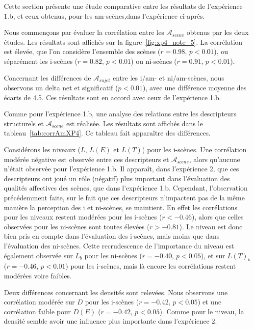 Cette section présente une étude comparative entre les résultats de l'expérience 1.b, et ceux obtenus, pour les am-scènes,dans l'expérience ci-après. 

Nous commençons par évaluer la corrélation entre les $\mathcal{A}_{scene}$ obtenus par les deux études. Les résultats sont affichés sur la figure~\ref{fig:xp4_note_5}. La corrélation est élevée, que l'on considère l'ensemble des scènes ($r=0.98$, $p<0.01$), ou séparément les i-scènes ($r=0.82$, $p<0.01$) ou ni-scènes ($r=0.91$, $p<0.01$).

Concernant les différences de $\mathcal{A}_{sujet}$ entre les i/am- et ni/am-scènes, nous observons un delta net et significatif ($p<0.01$), avec une différence moyenne des écarts de 4.5. Ces résultats sont en accord avec ceux de l'expérience 1.b.

Comme pour l'expérience 1.b, une analyse des relations entre les descripteurs structurels et $\mathcal{A}_{scene}$ est réalisée. Les résultats sont affichés dans le tableau~\ref{tab:corrAmXP4}. Ce tableau fait apparaître des différences. 

Considérons les niveaux ($L$, $L(E)$ et $L(T)$) pour les i-scènes. Une corrélation modérée négative est observée entre ces descripteurs et $\mathcal{A}_{scene}$, alors qu'aucune n'était observée pour l'expérience 1.b. Il apparaît, dans l'expérience 2, que ces descripteurs ont joué un rôle (négatif) plus important dans l'évaluation des qualités affectives des scènes, que dans l'expérience 1.b. Cependant, l'observation précédemment faite, sur le fait que ces descripteurs n'impactent pas de la même manière la perception des i et ni-scènes, se maintient. En effet les corrélations pour les niveaux restent modérées pour les i-scènes ($r<-0.46$), alors que celles observées pour les ni-scènes sont toutes élevées ($r>-0.81$). Le niveau est donc bien pris en compte dans l'évaluation des i-scènes, mais moins que dans l'évaluation des ni-scènes. Cette recrudescence de l'importance du niveau est également observée sur $L_b$ pour les ni-scènes ($r=-0.40$, $p<0.05$), et sur $L(T)_b$ ($r=-0.46$, $p<0.01$) pour les i-scènes, mais là encore les corrélations restent modérées voire faibles.

Deux différences concernant les densités sont relevées. Nous observons une corrélation modérée sur $D$ pour les i-scènes ($r=-0.42$, $p<0.05$) et une corrélation faible pour $D(E)$ ($r=-0.42$, $p<0.05$). Comme pour le niveau, la densité semble avoir une influence plus importante dans l'expérience 2. 

